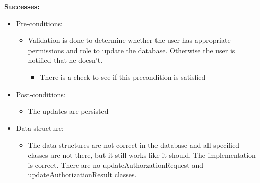 \textbf{Successes:}
\begin{itemize}

	
\item Pre-conditions:
	\begin{itemize}
		\item Validation is done to determine whether the user has appropriate permissions and role to update the database. Otherwise the user is notified that he doesn't.
			\begin{itemize}
					\item There is a check to see if this precondition is satisfied
			\end{itemize}
	\end{itemize}
		
	\item Post-conditions:
		\begin{itemize}
			\item The updates are persisted
		\end{itemize}
		
	\item Data structure:
		\begin{itemize}
			\item The data structures are not correct in the database and all specified classes are not there, but it still works like it should. The implementation is correct. There are no updateAuthorzationRequest and updateAuthorizationResult classes. 
		\end{itemize}
\end{itemize}

\noindent
\medskip

